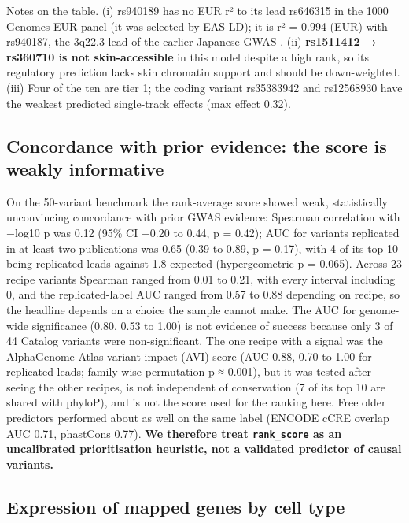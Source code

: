 \documentclass[10pt,twocolumn,a4paper]{article}
\begin{document}
Notes on the table. (i) rs940189 has no EUR r² to its lead rs646315 in the 1000 Genomes EUR panel (it was selected by EAS LD); it is r² = 0.994 (EUR) with rs940187, the 3q22.3 lead of the earlier Japanese GWAS \cite{k2}. (ii) \textbf{rs1511412 → rs360710 is not skin-accessible} in this model despite a high rank, so its regulatory prediction lacks skin chromatin support and should be down-weighted. (iii) Four of the ten are tier 1; the coding variant rs35383942 and rs12568930 have the weakest predicted single-track effects (max \textbar effect\textbar{} 0.32).

\subsection{Concordance with prior evidence: the score is weakly informative}

On the 50-variant benchmark the rank-average score showed weak, statistically unconvincing concordance with prior GWAS evidence: Spearman correlation with −log10 p was 0.12 (95\% CI −0.20 to 0.44, p = 0.42); AUC for variants replicated in at least two publications was 0.65 (0.39 to 0.89, p = 0.17), with 4 of its top 10 being replicated leads against 1.8 expected (hypergeometric p = 0.065). Across 23 recipe variants Spearman ranged from 0.01 to 0.21, with every interval including 0, and the replicated-label AUC ranged from 0.57 to 0.88 depending on recipe, so the headline depends on a choice the sample cannot make. The AUC for genome-wide significance (0.80, 0.53 to 1.00) is not evidence of success because only 3 of 44 Catalog variants were non-significant. The one recipe with a signal was the AlphaGenome Atlas variant-impact (AVI) score (AUC 0.88, 0.70 to 1.00 for replicated leads; family-wise permutation p ≈ 0.001), but it was tested after seeing the other recipes, is not independent of conservation (7 of its top 10 are shared with phyloP), and is not the score used for the ranking here. Free older predictors performed about as well on the same label (ENCODE cCRE overlap AUC 0.71, phastCons 0.77). \textbf{We therefore treat \texttt{rank\_score} as an uncalibrated prioritisation heuristic, not a validated predictor of causal variants.}

\subsection{Expression of mapped genes by cell type}
\end{document}
